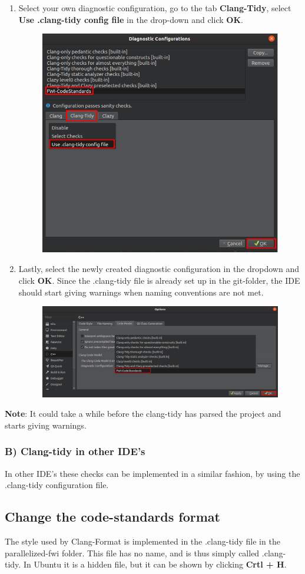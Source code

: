 \documentclass[10pt]{article}
\begin{document}
\begin{enumerate}
\item Select your own diagnostic configuration, go to the tab \textbf{Clang-Tidy}, select \textbf{Use .clang-tidy config
file} in the drop-down and click \textbf{OK}.
\begin{figure}[h!]
\centering
\includegraphics[width=0.55 \textwidth]{clang-tidy6.png}
\end{figure}

\newpage

\item Lastly, select the newly created diagnostic configuration in the dropdown and click \textbf{OK}. Since the .clang-tidy file is already set up in the git-folder, the IDE should start giving warnings when naming conventions are not met.
\begin{figure}[h!]
\centering
\includegraphics[width=0.85 \textwidth]{clang-tidy7.png}
\end{figure}
\end{enumerate}

\textbf{Note}: It could take a while before the clang-tidy has parsed the project and starts giving warnings.

\subsubsection*{B) Clang-tidy in other IDE's}
In other IDE’s these checks can be implemented in a similar fashion, by using the .clang-tidy configuration file.

\subsection*{Change the code-standards format}
The style used by Clang-Format is implemented in the .clang-tidy file in the parallelized-fwi folder. This file has no name, and is thus simply called .clang-tidy. In Ubuntu it is a hidden file, but it can be shown by clicking \textbf{Crtl + H}.
\end{document}
